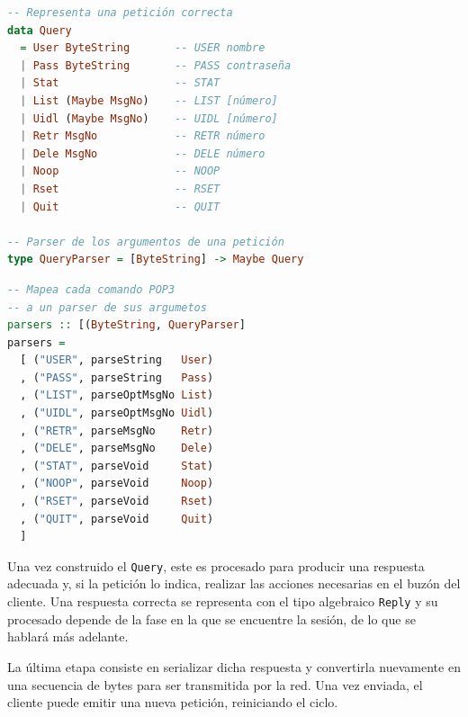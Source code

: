 \documentclass[a4paper]{CSMakotoTechnicalReport}
\begin{document}
\vspace{-24pt}
\begin{minipage}[t]{0.54\textwidth}
\begin{lstlisting}[language=Haskell, frame=none, numbers=none, basicstyle=\footnotesize]
-- Representa una petición correcta
data Query
  = User ByteString       -- USER nombre
  | Pass ByteString       -- PASS contraseña
  | Stat                  -- STAT
  | List (Maybe MsgNo)    -- LIST [número]
  | Uidl (Maybe MsgNo)    -- UIDL [número]
  | Retr MsgNo            -- RETR número
  | Dele MsgNo            -- DELE número
  | Noop                  -- NOOP
  | Rset                  -- RSET
  | Quit                  -- QUIT

-- Parser de los argumentos de una petición
type QueryParser = [ByteString] -> Maybe Query
\end{lstlisting}
\vspace{-4pt}
\captionsetup{type=lstlisting}
\caption{Definición de Query y QueryParser.}
\end{minipage}
\hfill
\begin{minipage}[t]{0.45\textwidth}
\begin{lstlisting}[language=Haskell, frame=none, numbers=none, basicstyle=\footnotesize]
-- Mapea cada comando POP3
-- a un parser de sus argumetos
parsers :: [(ByteString, QueryParser]
parsers = 
  [ ("USER", parseString   User)
  , ("PASS", parseString   Pass)
  , ("LIST", parseOptMsgNo List)
  , ("UIDL", parseOptMsgNo Uidl)
  , ("RETR", parseMsgNo    Retr)
  , ("DELE", parseMsgNo    Dele)
  , ("STAT", parseVoid     Stat)
  , ("NOOP", parseVoid     Noop)
  , ("RSET", parseVoid     Rset)
  , ("QUIT", parseVoid     Quit)
  ]
\end{lstlisting}
\vspace{-4pt}
\captionsetup{type=lstlisting}
\caption{Mapa de comandos a parsers.}
\end{minipage}
\vspace{2pt}

Una vez construido el \texttt{Query}, este es procesado para producir una respuesta adecuada y, si la petición lo indica, realizar las acciones necesarias en el buzón del cliente. Una respuesta correcta se representa con el tipo algebraico \texttt{Reply} y su procesado depende de la fase en la que se encuentre la sesión, de lo que se hablará más adelante.

La última etapa consiste en serializar dicha respuesta y convertirla nuevamente en una secuencia de bytes para ser transmitida por la red. Una vez enviada, el cliente puede emitir una nueva petición, reiniciando el ciclo.
\end{document}
